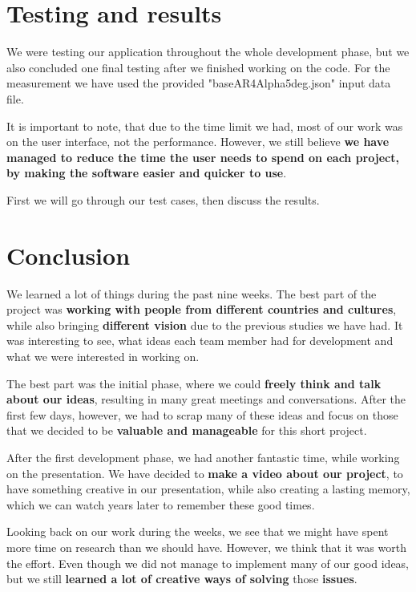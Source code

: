 \documentclass[a4paper, 11pt, article]{report}
\begin{document}

\chapter{Testing and results}

We were testing our application throughout the whole development phase, but we also concluded one final testing after we finished working on the code. For the measurement we have used the provided "baseAR4Alpha5deg.json" input data file.

It is important to note, that due to the time limit we had, most of our work was on the user interface, not the performance. However, we still believe \textbf{we have managed to reduce the time the user needs to spend on each project, by making the software easier and quicker to use}.

First we will go through our test cases, then discuss the results. 


\chapter{Conclusion}

We learned a lot of things during the past nine weeks. The best part of the project was \textbf{working with people from different countries and cultures}, while also bringing \textbf{different vision} due to the previous studies we have had. It was interesting to see, what ideas each team member had for development and what we were interested in working on.

The best part was the initial phase, where we could \textbf{freely think and talk about our ideas}, resulting in many great meetings and conversations. After the first few days, however, we had to scrap many of these ideas and focus on those that we decided to be \textbf{valuable and manageable} for this short project.

After the first development phase, we had another fantastic time, while working on the presentation. We have decided to \textbf{make a video about our project}, to have something creative in our presentation, while also creating a lasting memory, which we can watch years later to remember these good times.

Looking back on our work during the weeks, we see that we might have spent more time on research than we should have. However, we think that it was worth the effort. Even though we did not manage to implement many of our good ideas, but we still \textbf{learned a lot of creative ways of solving} those \textbf{issues}.
\end{document}
